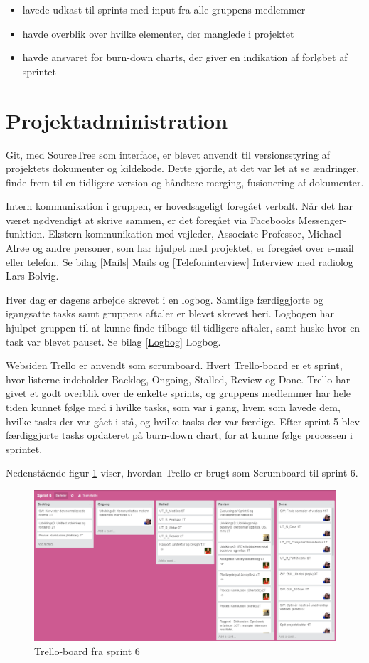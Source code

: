 \let\labelitemi\labelitemii
\begin{itemize}
\item lavede udkast til sprints  med input fra alle gruppens medlemmer
\item havde overblik over hvilke elementer, der manglede i projektet
\item havde ansvaret for burn-down charts, der giver en indikation af forløbet af sprintet
\end{itemize} 

\section{Projektadministration}
Git, med SourceTree som interface, er blevet anvendt til versionsstyring af projektets dokumenter og kildekode. Dette gjorde, at det var let at se ændringer, finde frem til en tidligere version og håndtere merging, fusionering af dokumenter.

Intern kommunikation i gruppen, er hovedsageligt foregået verbalt. Når det har været nødvendigt at skrive sammen, er det foregået via Facebooks Messenger-funktion. Ekstern kommunikation med vejleder, Associate Professor, Michael Alrøe og andre personer, som har hjulpet med projektet, er foregået over e-mail eller telefon. Se bilag \ref{Mails} Mails og \ref{Telefoninterview} Interview med radiolog Lars Bolvig.  

Hver dag er dagens arbejde skrevet i en logbog. Samtlige færdiggjorte og igangsatte tasks samt gruppens aftaler er blevet skrevet heri. Logbogen har hjulpet gruppen til at kunne finde tilbage til tidligere aftaler, samt huske hvor en task var blevet pauset. Se bilag \ref{Logbog} Logbog.  

Websiden Trello er anvendt som scrumboard. Hvert Trello-board er et sprint, hvor listerne indeholder Backlog, Ongoing, Stalled, Review og Done. Trello har givet et godt overblik over de enkelte sprints, og gruppens medlemmer har hele tiden kunnet følge med i hvilke tasks, som var i gang, hvem som lavede dem, hvilke tasks der var gået i stå, og hvilke tasks der var færdige. Efter sprint 5 blev færdiggjorte tasks opdateret på burn-down chart, for at kunne følge processen i sprintet. 

Nedenstående figur \ref{Trello} viser, hvordan Trello er brugt som Scrumboard til sprint 6. 

\begin{figure}[H]
    \centering
    \includegraphics[width=1\textwidth]{figurer/d/Trello}
    \caption{Trello-board fra sprint 6}
    \label{Trello}
\end{figure}

